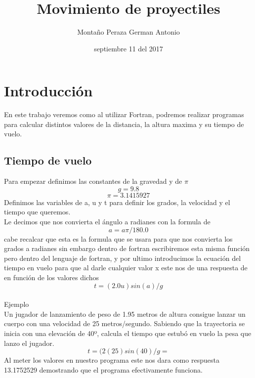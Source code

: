 \documentclass{article}
\date{septiembre 11 del 2017}
\title{Movimiento de proyectiles}
\author{Montaño Peraza German Antonio}
\begin{document}
\maketitle
\section{Introducción}
En este trabajo veremos como al utilizar Fortran, podremos realizar programas para calcular distintos valores de la distancia, la altura maxima y su tiempo de vuelo.
\subsection{Tiempo de vuelo}
Para empezar definimos las constantes de la gravedad y de \(\pi\)\\
\[g=9.8\]
\[\pi=3.1415927\]
Definimos las variables de a, u y t para definir los grados, la velocidad y el tiempo que queremos.\\
Le decimos que nos convierta el ángulo a radianes con la formula de\\                                     \[a=a\pi/180.0\]
cabe recalcar que esta es la formula que se usara para que nos convierta los grados a radianes sin embargo dentro de fortran escribiremos esta misma función pero dentro del lenguaje de fortran, y por ultimo introducimos la ecuación del tiempo en vuelo para que al darle cualquier valor x este nos de una respuesta de en función de los valores dichos\\
\[t=(2.0u)sin(a)/g\]
\\Ejemplo\\
Un jugador de lanzamiento de peso de 1.95 metros de altura consigue lanzar un cuerpo con una velocidad de 25 metros/segundo. Sabiendo que la trayectoria se inicia con una elevación de 40º, calcula el tiempo que estubó en vuelo la pesa que lanzo el jugador.
\[t=(2(25)sin(40)/g=\]
Al meter los valores en nuestro programa este nos dara como respuesta 13.1752529 demostrando que el programa efectivamente funciona.
\end{document}
